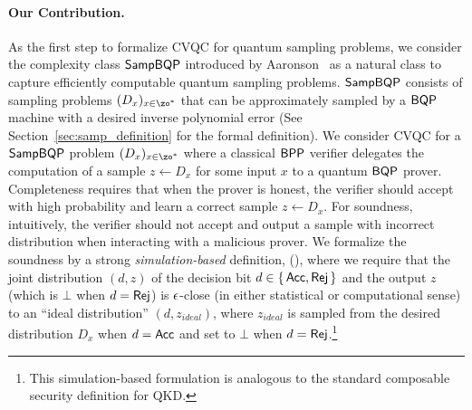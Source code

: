

\vspace{-3pt}

\paragraph{Our Contribution.}
As the first step to formalize CVQC for quantum sampling problems, we consider the complexity class $\operatorname{\mathsf{SampBQP}}$ introduced by Aaronson~\cite{aaronson_2013} as a natural class to capture efficiently computable quantum sampling problems. 
%
$\operatorname{\mathsf{SampBQP}}$ consists of sampling problems $(D_x)_{x\in\zo^*}$ that can be approximately sampled by a $\operatorname{\mathsf{BQP}}$ machine with a desired inverse polynomial error (See Section~\ref{sec:samp_definition} for the formal definition). We consider CVQC for a $\operatorname{\mathsf{SampBQP}}$ problem $(D_x)_{x\in\zo^*}$ where a classical $\operatorname{\mathsf{BPP}}$ verifier delegates the computation of a sample $z\leftarrow D_x$ for some input $x$ to a quantum $\operatorname{\mathsf{BQP}}$ prover. Completeness requires that when the prover is honest, the verifier should accept with high probability and learn a correct sample $z\leftarrow D_x$. For soundness, intuitively, the verifier should not accept and output a sample with incorrect distribution  when interacting with a malicious prover. We formalize the soundness by a strong \emph{simulation-based} definition, (),
where we require that the joint distribution $(d,z)$ of the decision bit $d \in \set{\mathsf{Acc}, \mathsf{Rej}}$ and the output $z$ (which is $\bot$ when $d = \mathsf{Rej}$) is $\epsilon$-close (in  either statistical or computational sense) to an ``ideal distribution'' $(d,z_{ideal})$, where $z_{ideal}$ is sampled from the desired distribution $D_x$ when $d = \mathsf{Acc}$ and set to $\bot$ when $d = \mathsf{Rej}$.\footnote{This simulation-based formulation is analogous to the standard composable security definition for QKD.} 
%

